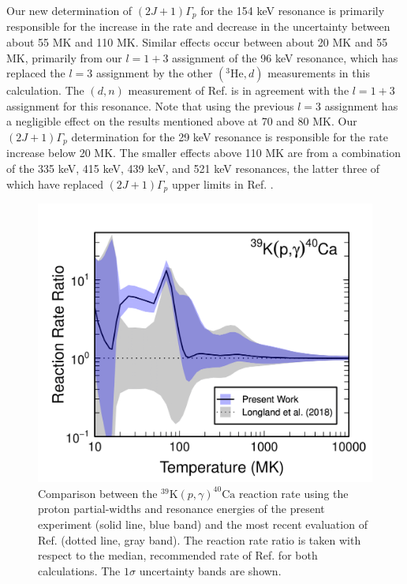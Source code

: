 Our new determination of $(2J+1)\Gamma_{p}$ for the 154 keV resonance is primarily responsible for the increase in the rate and decrease in the uncertainty between about 55 MK and 110 MK. Similar effects occur between about 20 MK and 55 MK, primarily from our $l=1+3$ assignment of the 96 keV resonance, which has replaced the $l=3$ assignment by the other $(^{3}\mathrm{He}, d)$ measurements in this calculation. The $(d,n)$ measurement of Ref. \cite{Fuchs1969} is in agreement with the $l=1+3$ assignment for this resonance. Note that using the previous $l=3$ assignment has a negligible effect on the results mentioned above at 70 and 80 MK. Our $(2J+1)\Gamma_{p}$ determination for the 29 keV resonance is responsible for the rate increase below 20 MK. The smaller effects above 110 MK are from a combination of the 335 keV, 415 keV, 439 keV, and 521 keV resonances, the latter three of which have replaced $(2J+1)\Gamma_{p}$ upper limits in Ref. \cite{Longland2018}.

\begin{figure}[t]
\includegraphics[width=6.5in]{Chapter-6/figs/rateCompare.png} %
\caption{\label{fig:rateCompare}Comparison between the $^{39}\mathrm{K}(p, \gamma)^{40}\mathrm{Ca}$ reaction rate using the proton partial-widths and resonance energies of the present experiment (solid line, blue band) and the most recent evaluation of Ref. \cite{Longland2018} (dotted line, gray band). The reaction rate ratio is taken with respect to the median, recommended rate of Ref. \cite{Longland2018} for both calculations. The $1\sigma$ uncertainty bands are shown.}
\end{figure}

